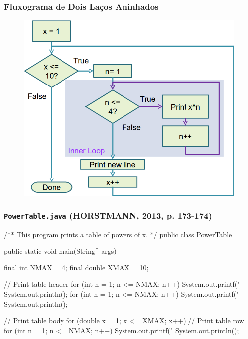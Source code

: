 \documentclass[xcolor={dvipsnames,table},aspectratio=169]{beamer}
\begin{document}
\begin{frame}\frametitle{Fluxograma de Dois Laços Aninhados}
\begin{figure}[h]
	\includegraphics[height=0.65\paperheight,center]{pucrs-ep-fprog-unidade_04-lacos-laminas-fluxograma_lacos_aninhados.png}
\end{figure}
\end{frame}

\begin{frame}[fragile]\frametitle{\texttt{PowerTable.java} {\tiny (HORSTMANN, 2013, p. 173-174)}}
{\tiny
\begin{javacode}
/** This program prints a table of powers of x. */
public class PowerTable {
   public static void main(String[] args) {
      final int NMAX = 4;
      final double XMAX = 10;

      // Print table header
      for (int n = 1; n <= NMAX; n++) {
         System.out.printf("%
      }
      System.out.println();
      for (int n = 1; n <= NMAX; n++) {
         System.out.printf("%
      }
      System.out.println();

      // Print table body
      for (double x = 1; x <= XMAX; x++) {
         // Print table row
         for (int n = 1; n <= NMAX; n++) {
            System.out.printf("%
         }
         System.out.println();
      }
   }
}
\end{javacode}
}
\end{frame}
\end{document}

